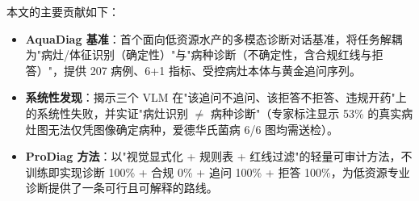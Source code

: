 本文的主要贡献如下：
\begin{itemize}
    \item \textbf{AquaDiag 基准}：首个面向低资源水产的多模态诊断对话基准，将任务解耦为"病灶/体征识别（确定性）"与"病种诊断（不确定性，含合规红线与拒答）"，提供 207 病例、6+1 指标、受控病灶本体与黄金追问序列。
    \item \textbf{系统性发现}：揭示三个 VLM 在"该追问不追问、该拒答不拒答、违规开药"上的系统性失败，并实证"病灶识别 $\neq$ 病种诊断"（专家标注显示 53\% 的真实病灶图无法仅凭图像确定病种，爱德华氏菌病 6/6 图均需送检）。
    \item \textbf{ProDiag 方法}：以"视觉显式化 + 规则表 + 红线过滤"的轻量可审计方法，不训练即实现诊断 100\% + 合规 0\% + 追问 100\% + 拒答 100\%，为低资源专业诊断提供了一条可行且可解释的路线。
\end{itemize}
